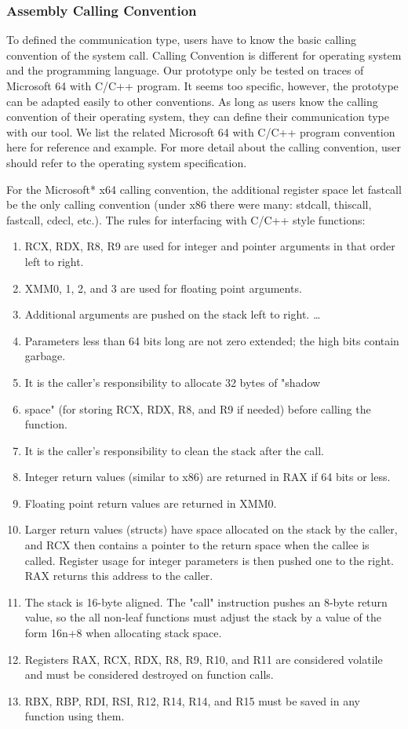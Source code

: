 \documentclass[paper=a4, fontsize=11pt]{scrartcl}
\numberwithin{equation}{section}		%
\numberwithin{figure}{section}			%
\numberwithin{table}{section}				%
\begin{document}
\subsubsection{Assembly Calling Convention}
To defined the communication type, users have to know the basic calling convention of the system call. 
Calling Convention is different for operating system and the programming language. Our prototype only be tested on traces of Microsoft 64 with C/C++ program. It seems too specific, however, the prototype can be adapted easily to other conventions. As long as users know the calling convention of their operating system, they can define their communication type with our tool. We list the related Microsoft 64 with C/C++ program convention here for reference and example. For more detail about the calling convention, user should refer to the operating system specification.\par
For the Microsoft* x64 calling convention, the additional register space let fastcall be the only calling convention (under x86 there were many: stdcall, thiscall, fastcall, cdecl, etc.). The rules for interfacing with C/C++ style functions:\par
\begin{enumerate}  
\item RCX, RDX, R8, R9 are used for integer and pointer arguments in that order left to right.
\item XMM0, 1, 2, and 3 are used for floating point arguments.
\item Additional arguments are pushed on the stack left to right. \ldots 
\item Parameters less than 64 bits long are not zero extended; the high bits contain garbage.
\item It is the caller's responsibility to allocate 32 bytes of "shadow \item space" (for storing RCX, RDX, R8, and R9 if needed) before calling the function.
\item It is the caller's responsibility to clean the stack after the call.
\item Integer return values (similar to x86) are returned in RAX if 64 bits or less.
\item Floating point return values are returned in XMM0.
\item Larger return values (structs) have space allocated on the stack by the caller, and RCX then contains a pointer to the return space when the callee is called. Register usage for integer parameters is then pushed one to the right. RAX returns this address to the caller.
\item The stack is 16-byte aligned. The "call" instruction pushes an 8-byte return value, so the all non-leaf functions must adjust the stack by a value of the form 16n+8 when allocating stack space.
\item Registers RAX, RCX, RDX, R8, R9, R10, and R11 are considered volatile and must be considered destroyed on function calls.
\item RBX, RBP, RDI, RSI, R12, R14, R14, and R15 must be saved in any function using them.
\end{enumerate}
\end{document}
